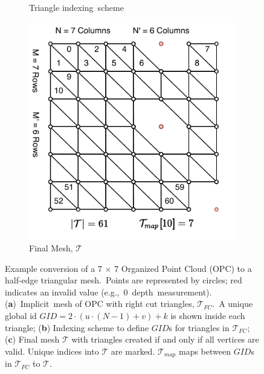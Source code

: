 \begin{figure}[H]
\begin{subfigure}[t]{.33\linewidth}
    \caption{\label{fig:ch3_OPC_HE} Triangle indexing~scheme}\vspace{6pt}
  \end{subfigure}
  \begin{subfigure}[t]{.33\linewidth}
     \centering\includegraphics[width=.95\linewidth]{chapter_3_polylidar3d/imgs/OPCHalfEdge-OPC-Mesh_actual_V2.pdf}
    \caption{\label{fig:ch3_OPC_Mesh} Final Mesh, $\mathcal{T}$ }\vspace{6pt}
  \end{subfigure}
  \caption[Converting an organized point cloud into a 3D triangular mesh]{Example conversion of a 7 $\times$ 7 Organized Point Cloud (OPC) to a half-edge triangular mesh.~Points are represented by circles; red indicates an invalid value (e.g.,~0~depth~measurement). (\textbf{a})~Implicit~mesh of \ac{OPC} with right cut triangles, $\mathcal{T}_{FC}$.~A unique global id $GID = 2 \cdot (u \cdot (N-1) + v) + k$ is shown inside each triangle;  (\textbf{b}) Indexing scheme to define $GID$s for triangles in $\mathcal{T}_{FC}$; (\textbf{c}) Final mesh $\mathcal{T}$ with triangles created if and only if all vertices are valid. Unique indices into $\mathcal{T}$  are marked.  $\mathcal{T}_{map}$ maps between $GID$s in $\mathcal{T}_{FC}$ to $\mathcal{T}$. }\label{fig:ch3_OPC_Mesh_all}
\end{figure}
